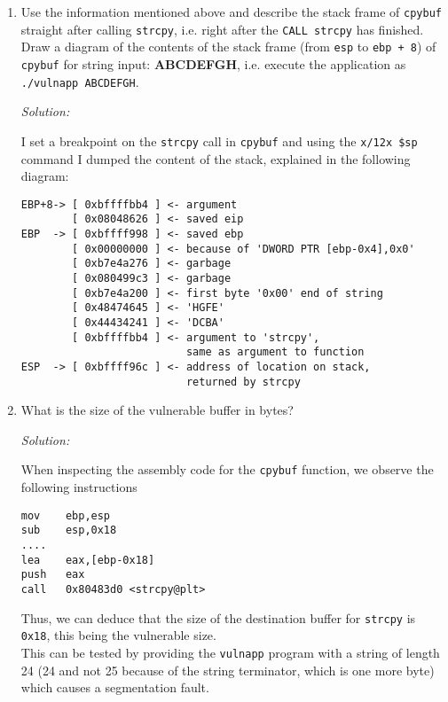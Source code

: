 \documentclass[a4paper,11pt]{article}
\newenvironment{solution}%
{\par{\noindent\small\textit{Solution:}}\vspace{-12pt}\begin{framed}}%
{\end{framed}\par}
\begin{document}
\begin{enumerate}
\begin{solution}
\end{solution}\fi

\item Use the information mentioned above and describe the stack frame of \texttt{cpybuf}
straight after calling \texttt{strcpy}, i.e. right after the \texttt{CALL
strcpy} has finished. Draw a diagram of the contents of the stack frame (from
\texttt{esp} to \texttt{ebp + 8}) of \texttt{cpybuf} for string input:
\textbf{ABCDEFGH}, i.e. execute the application as \texttt{./vulnapp ABCDEFGH}.


\ifsolution\begin{solution}

I set a breakpoint on the \texttt{strcpy} call in \texttt{cpybuf} and using
the \texttt{x/12x \$sp} command I dumped the content of the stack, explained in
the following diagram:
\begin{lstlisting}
EBP+8-> [ 0xbffffbb4 ] <- argument
        [ 0x08048626 ] <- saved eip
EBP  -> [ 0xbffff998 ] <- saved ebp
        [ 0x00000000 ] <- because of 'DWORD PTR [ebp-0x4],0x0'
        [ 0xb7e4a276 ] <- garbage
        [ 0x080499c3 ] <- garbage
        [ 0xb7e4a200 ] <- first byte '0x00' end of string
        [ 0x48474645 ] <- 'HGFE'
        [ 0x44434241 ] <- 'DCBA'
        [ 0xbffffbb4 ] <- argument to 'strcpy',
                          same as argument to function
ESP  -> [ 0xbffff96c ] <- address of location on stack,
                          returned by strcpy
\end{lstlisting}

\end{solution}\fi

\item What is the size of the vulnerable buffer in bytes?

\ifsolution\begin{solution}
When inspecting the assembly code for the \texttt{cpybuf} function, we observe the
following instructions
\begin{lstlisting}
mov    ebp,esp
sub    esp,0x18
....
lea    eax,[ebp-0x18]
push   eax
call   0x80483d0 <strcpy@plt>
\end{lstlisting}
Thus, we can deduce that the size of the destination buffer for \texttt{strcpy} is \texttt{0x18},
this being the vulnerable size.\\
This can be tested by providing the \texttt{vulnapp} program with a string of length 24 (24 and
not 25 because of the string terminator, which is one more byte) which causes a segmentation
fault.
\end{solution}\fi
\end{enumerate}
\end{document}
